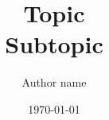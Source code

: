 \documentclass[a4paper]{report}
\begin{document}
\title{\Huge{Topic}\\Subtopic}
\author{\huge{Author name}}
\date{\today}
\maketitle

\clearpage
\tableofcontents
\clearpage
\end{document}
